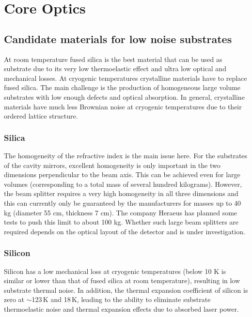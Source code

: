 \chapter{Core Optics}
\label{sec:Appendix_Core_optics}

\section{Candidate materials for low noise substrates}
At room temperature fused silica is the best material that can be used as substrate due to its very low thermoelastic effect and ultra low optical and mechanical losses.
At cryogenic temperatures crystalline materials have to replace fused silica. The main challenge is the production of homogeneous large volume substrates with low enough defects and optical absorption. In general, crystalline materials have much less Brownian noise at cryogenic temperatures due to their ordered lattice structure.
\subsection{Silica}
The homogeneity of the refractive index is the main issue here. For the substrates of the cavity mirrors, excellent homogeneity is only important in the two dimensions perpendicular to the beam axis. This can be achieved even for large volumes (corresponding to a total mass of several hundred kilograms). However, the beam splitter requires a very high homogeneity in all three dimensions and this can currently only be guaranteed by the manufacturers for masses up to 40 kg (diameter 55 cm, thickness 7 cm). The company Heraeus has planned some tests to push this limit to about 100 kg. Whether such large beam splitters are required depends on the optical layout of the detector and is under investigation.

\subsection{Silicon}
Silicon has a low mechanical loss at cryogenic temperatures (below 10 K is similar or lower than that of fused silica at room temperature), resulting in low substrate thermal noise. In addition, the thermal expansion coefficient of silicon is zero at $\sim$123\,K and 18\,K, leading to the ability to eliminate substrate thermoelastic noise and thermal expansion effects due to absorbed laser power.

